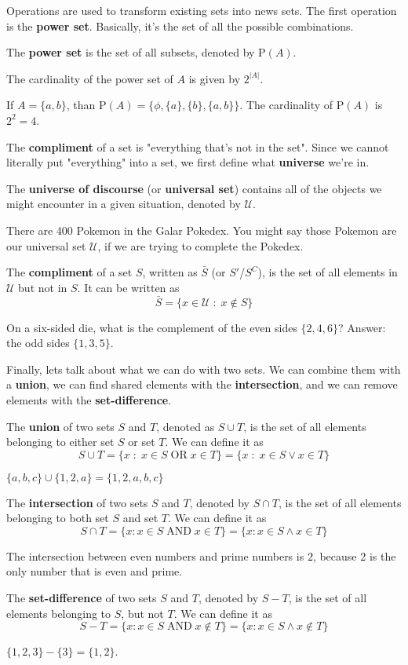 Operations are used to transform existing sets into news sets.  The first operation is the {\bf power set}. Basically, it's the set of all the possible combinations.

\mydefine
{
	The {\bf power set} is the set of all subsets, denoted by $\text{P}(A)$.
}

\myproposition
{
	The cardinality of the power set of $A$ is given by $2^{|A|}$.
}

\myexample
{
	If $A=\{a,b\}$, than $\text{P}(A) = \{\phi,\{a\},\{b\},\{a,b\}\}$. The cardinality of $\text{P}(A)$ is $2^{2}=4$.
}

The {\bf compliment} of a set is "everything that's not in the set". Since we cannot literally put "everything" into a set, we first define what {\bf universe} we're in. 

\mydefine
{
	The {\bf universe of discourse} (or {\bf universal set}) contains all of the objects we might encounter in a given situation, denoted by $\mathcal{U}$.
}

\myexample
{
	There are 400 Pokemon in the Galar Pokedex. You might say those Pokemon are our universal set $\mathcal{U}$, if we are trying to complete the Pokedex.
}

\mydefine
{
	The {\bf compliment} of a set $S$, written as $\bar{S}$ (or $S'$/$S^C$), is the set of all elements in $\mathcal{U}$ but not in $S$. It can be written as
	\[
		\bar{S} = \{x \in \mathcal{U} \;:\; x \notin S\}
	\]
}

\myexample
{
	On a six-sided die, what is the complement of the even sides $\{2,4,6\}$? Answer: the odd sides $\{1,3,5\}$.
}

Finally, lets talk about what we can do with two sets. We can combine them with a {\bf union}, we can find shared elements with the {\bf intersection}, and we can remove elements with the {\bf set-difference}.

\mydefine
{
	The {\bf union} of two sets $S$ and $T$, denoted as $S \cup T$, is the set of all elements belonging to either set $S$ or set $T$. We can define it as
	\[
		S \cup T = \{x \;:\; x \in S \;\text{OR}\; x \in T \} = \{x \;:\; x \in S \vee x \in T \}
	\]
}

\myexample
{
	$\{a,b,c\} \cup \{1,2,a\} = \{1,2,a,b,c\}$
}

\mydefine
{
	The {\bf intersection} of two sets $S$ and $T$, denoted by $S\cap T$, is the set of all elements belonging to both set $S$ and set $T$. We can define it as
	\[
		S \cap T = \{ x : x \in S \;\text{AND}\; x \in T\} = \{ x : x \in S \wedge x \in T\}
	\]
}

\myexample
{
	The intersection between even numbers and prime numbers is ${2}$, because 2 is the only number that is even and prime.
}

\mydefine
{
	The {\bf set-difference} of two sets $S$ and $T$, denoted by $S-T$, is the set of all elements belonging to $S$, but not $T$. We can define it as
	\[
		S-T = \{x : x \in S \;\text{AND}\; x \notin T\} = \{x : x \in S \wedge x \notin T\}
	\]
}

\myexample
{
	$\{1,2,3\} - \{3\} = \{1,2\}$.
}
